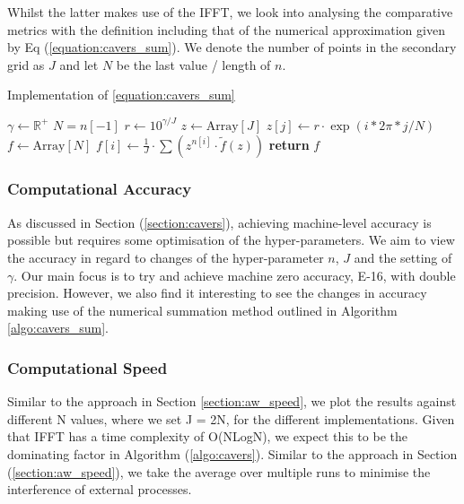 \documentclass[a4paper]{report}
\begin{document}
Whilst the latter makes use of the IFFT, we look into analysing the comparative metrics with the definition including that of the numerical approximation given by Eq (\ref{equation:cavers_sum}). We denote the number of points in the secondary grid as $J$ and let $N$ be the last value / length of $n$.

\begin{algorithm}[H]
\caption{Implementation of \autoref{equation:cavers_sum}}
\label{algo:cavers_sum}
\begin{algorithmic}[1]
	\State $\gamma \gets \mathbb{R}^+$
	\State $N = n[-1]$
    \State $r \gets 10^{\gamma / J}$ 
    \State $z \gets \text{Array}[J]$
                \State $z[j] \gets r \cdot \exp{(i * 2\pi * j / N)}$
            \EndFor
    \State $f \gets \text{Array}[N]$
        \State $f[i] \gets \frac{1}{J} \cdot \sum (z^{n[i]} \cdot \tilde{f}(z))$ 
    \EndFor
    \State \textbf{return} $f$
\EndProcedure
\end{algorithmic}
\end{algorithm}

\subsubsection{Computational Accuracy}
As discussed in Section (\ref{section:cavers}), achieving machine-level accuracy is possible but requires some optimisation of the hyper-parameters. We aim to view the accuracy in regard to changes of the hyper-parameter $n$, $J$ and the setting of $\gamma$. Our main focus is to try and achieve machine zero accuracy, E-16, with double precision. However, we also find it interesting to see the changes in accuracy making use of the numerical summation method outlined in Algorithm \ref{algo:cavers_sum}.

\subsubsection{Computational Speed}
Similar to the approach in Section \ref{section:aw_speed}, we plot the results against different N values, where we set J = 2N, for the different implementations. Given that IFFT has a time complexity of O(NLogN), we expect this to be the dominating factor in Algorithm (\ref{algo:cavers}). Similar to the approach in Section (\ref{section:aw_speed}), we take the average over multiple runs to minimise the interference of external processes.
\end{document}
